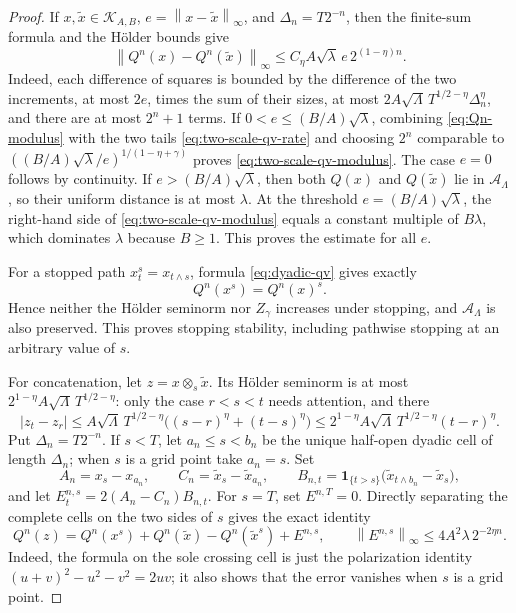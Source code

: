 \documentclass[11pt,reqno]{amsart}
\theoremstyle{plain}
\theoremstyle{definition}
\newcommand{\cK}{\mathcal K}
\newcommand{\one}{\mathbf 1}
\newcommand{\norm}[1]{\left\lVert #1\right\rVert}
\newcommand{\abs}[1]{\left\lvert #1\right\rvert}
\begin{document}
\begin{proof}
If \(x,\widetilde x\in\cK_{A,B}\),
\(e=\norm{x-\widetilde x}_\infty\), and
\(\Delta_n=T2^{-n}\), then the finite-sum formula and the H\"older bounds give
\begin{equation}\label{eq:Qn-modulus}
  \norm{Q^n(x)-Q^n(\widetilde x)}_\infty
  \le C_\eta A\sqrt\lambda\,e\,2^{(1-\eta)n}.
\end{equation}
Indeed, each difference of squares is bounded by the difference of the two
increments, at most \(2e\), times the sum of their sizes, at most
  \(2A\sqrt\Lambda\,T^{1/2-\eta}\Delta_n^\eta\), and there are at most
  \(2^n+1\) terms.  If \(0<e\le(B/A)\sqrt\lambda\), combining
\eqref{eq:Qn-modulus} with the two tails
\eqref{eq:two-scale-qv-rate} and choosing
\(2^n\) comparable to
\(((B/A)\sqrt\lambda/e)^{1/(1-\eta+\gamma)}\) proves
\eqref{eq:two-scale-qv-modulus}.  The case \(e=0\) follows by continuity.
If \(e>(B/A)\sqrt\lambda\), then both \(Q(x)\) and \(Q(\widetilde x)\)
lie in \(\mathcal A_\Lambda\), so their uniform distance is at most
\(\lambda\).  At the threshold \(e=(B/A)\sqrt\lambda\), the right-hand side
of \eqref{eq:two-scale-qv-modulus} equals a constant multiple of
\(B\lambda\), which dominates \(\lambda\) because \(B\ge1\).  This proves
the estimate for all \(e\).

For a stopped path \(x^s_t=x_{t\wedge s}\), formula
\eqref{eq:dyadic-qv} gives exactly
\[
  Q^n(x^s)=Q^n(x)^s.
\]
Hence neither the H\"older seminorm nor \(Z_\gamma\) increases under stopping,
and \(\mathcal A_\Lambda\) is also preserved.  This proves stopping
stability, including pathwise stopping at an arbitrary value of \(s\).

For concatenation, let \(z=x\otimes_s\widetilde x\).  Its H\"older seminorm
is at most \(2^{1-\eta}A\sqrt\Lambda\,T^{1/2-\eta}\): only the case
\(r<s<t\) needs attention, and there
\[
  \abs{z_t-z_r}
  \le A\sqrt\Lambda\,T^{1/2-\eta}
       \bigl((s-r)^\eta+(t-s)^\eta\bigr)
  \le2^{1-\eta}A\sqrt\Lambda\,T^{1/2-\eta}(t-r)^\eta.
\]
Put \(\Delta_n=T2^{-n}\).  If \(s<T\), let
\(a_n\le s<b_n\) be the unique half-open dyadic cell of length
\(\Delta_n\); when \(s\) is a grid point take \(a_n=s\).  Set
\[
  A_n=x_s-x_{a_n},\qquad
  C_n=\widetilde x_s-\widetilde x_{a_n},\qquad
  B_{n,t}
  =\one_{\{t>s\}}
   \bigl(\widetilde x_{t\wedge b_n}-\widetilde x_s\bigr),
\]
and let \(E_t^{n,s}=2(A_n-C_n)B_{n,t}\).  For \(s=T\), set
\(E^{n,T}=0\).  Directly separating the complete cells on the two sides of
\(s\) gives the exact identity
\[
  Q^n(z)
  =Q^n(x^s)+Q^n(\widetilde x)-Q^n(\widetilde x^s)+E^{n,s},
  \qquad
  \norm{E^{n,s}}_\infty
  \le4A^2\lambda\,2^{-2\eta n}.
\]
Indeed, the formula on the sole crossing cell is just the polarization
identity \((u+v)^2-u^2-v^2=2uv\); it also shows that the error vanishes when
\(s\) is a grid point.


\end{proof}
\end{document}
